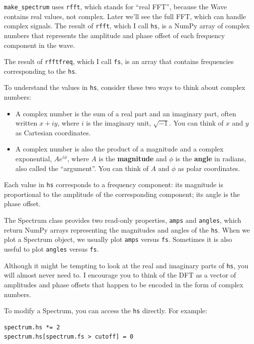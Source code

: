 \documentclass[12pt]{book}
\begin{document}
\verb"make_spectrum" uses {\tt rfft}, which stands for ``real
FFT'', because the Wave contains real values, not complex.  Later
we'll see the full FFT, which can handle complex signals.  The result
of {\tt rfft}, which I call {\tt hs}, is a NumPy array of complex
numbers that represents the amplitude and phase offset of each
frequency component in the wave.

The result of {\tt rfftfreq}, which I call {\tt fs}, is an array that
contains frequencies corresponding to the {\tt hs}.

To understand the values in {\tt hs}, consider these two ways to think
about complex numbers:

\begin{itemize}

\item A complex number is the sum of a real part and an imaginary
  part, often written $x + iy$, where $i$ is the imaginary unit,
  $\sqrt{-1}$.  You can think of $x$ and $y$ as Cartesian coordinates.

\item A complex number is also the product of a magnitude and a
  complex exponential, $A e^{i \phi}$, where $A$ is the {\bf
    magnitude} and $\phi$ is the {\bf angle} in radians, also called
  the ``argument''.  You can think of $A$ and $\phi$ as polar
  coordinates.

\end{itemize}

Each value in {\tt hs} corresponds to a frequency component: its
magnitude is proportional to the amplitude of the corresponding
component; its angle is the phase offset.

The Spectrum class provides two read-only properties, {\tt amps}
and {\tt angles}, which return NumPy arrays representing the
magnitudes and angles of the {\tt hs}.  When we plot a Spectrum
object, we usually plot {\tt amps} versus {\tt fs}.  Sometimes
it is also useful to plot {\tt angles} versus {\tt fs}.

Although it might be tempting to look at the real and imaginary
parts of {\tt hs}, you will almost never need to.  I encourage
you to think of the DFT as a vector of amplitudes and phase offsets
that happen to be encoded in the form of complex numbers.

To modify a Spectrum, you can access the {\tt hs} directly.
For example:

\begin{verbatim}
spectrum.hs *= 2
spectrum.hs[spectrum.fs > cutoff] = 0
\end{verbatim}
\end{document}
